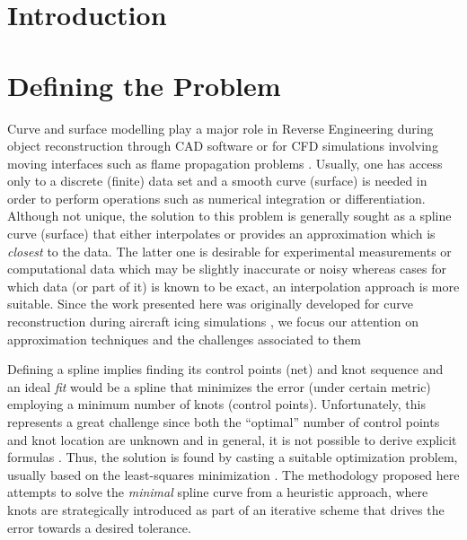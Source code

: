 \documentclass[a4paper,12pt]{article}
\author{Julia Docampo}
\begin{document}
 
 
 \section{Introduction}
 \section{Defining the Problem}
 Curve and surface modelling play a major role in Reverse Engineering during object reconstruction
  through CAD software \cite{Ma1998} or for CFD simulations involving moving
  interfaces such as flame propagation problems \cite{malladi1995}. 
  Usually, one has access only to a discrete (finite) data set 
  and a smooth curve (surface) is needed in order to perform operations such as numerical integration or differentiation. 
  Although not unique, the solution to this problem is generally sought as a spline curve (surface)  
  that either interpolates or provides an approximation which is \emph{closest} to the data.  
   The latter one is desirable for experimental measurements or computational data 
   which may be slightly inaccurate or noisy whereas cases for which data (or part of it) is known to be exact, 
  an interpolation approach \cite{} is more suitable. 
   Since the work presented here was originally developed for curve reconstruction during 
    aircraft icing simulations \cite{}, we focus our attention on approximation techniques and the challenges associated to them 
    
    Defining a spline implies finding its control points (net) and knot sequence 
    and an ideal \emph{fit} would be a spline that minimizes the error (under certain metric) 
    employing a minimum number of knots (control points). 
    Unfortunately, this represents a great challenge since both the ``optimal'' number of control points 
  and knot location are unknown and in general, it is not possible to derive explicit formulas \cite{jupp1978}.  
  Thus, the solution is found by casting a suitable optimization problem, 
  usually based on the least-squares minimization \cite{nurbs_book, deboor2001practical, schumaker2015spline}. 
   The methodology proposed here attempts to solve the \emph{minimal} spline curve from a heuristic approach, where 
   knots are strategically introduced as part of an iterative scheme that drives the error towards a desired tolerance. 
      
\end{document}
